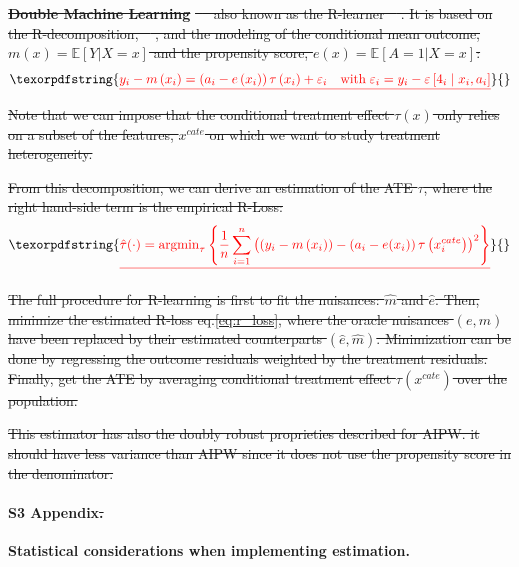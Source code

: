 \documentclass[10pt,letterpaper]{article}
\providecommand{\DIFdeltex}[1]{{\protect\color{red}\sout{#1}}}                      %
\providecommand{\DIFdelbegin}{} %
\providecommand{\DIFdelend}{} %
\providecommand{\DIFdel}[1]{\texorpdfstring{\DIFdeltex{#1}}{}} %
\newcommand{\DIFscaledelfig}{0.5}
\newlength{\DIFdelgraphicswidth} %
\newlength{\DIFdelgraphicsheight} %
\newcommand{\DIFdelincludegraphics}[2][]{%
\sbox{\DIFdelgraphicsbox}{\DIFOincludegraphics[#1]{#2}}%
\settoboxwidth{\DIFdelgraphicswidth}{\DIFdelgraphicsbox} %
\settoboxtotalheight{\DIFdelgraphicsheight}{\DIFdelgraphicsbox} %
\scalebox{\DIFscaledelfig}{%
\parbox[b]{\DIFdelgraphicswidth}{\usebox{\DIFdelgraphicsbox}\\[-\baselineskip] \rule{\DIFdelgraphicswidth}{0em}}\llap{\resizebox{\DIFdelgraphicswidth}{\DIFdelgraphicsheight}{%
\setlength{\unitlength}{\DIFdelgraphicswidth}%
\begin{picture}(1,1)%
\thicklines\linethickness{2pt} %
{\color[rgb]{1,0,0}\put(0,0){\framebox(1,1){}}}%
{\color[rgb]{1,0,0}\put(0,0){\line( 1,1){1}}}%
{\color[rgb]{1,0,0}\put(0,1){\line(1,-1){1}}}%
\end{picture}%
}\hspace*{3pt}}} %
} %
\DeclareRobustCommand{\DIFdelbegin}{\DIFOdelbegin \let\includegraphics\DIFdelincludegraphics} %
\DeclareRobustCommand{\DIFdelend}{\DIFOaddend \let\includegraphics\DIFOincludegraphics} %
\begin{document}
\textbf{\DIFdel{Double Machine Learning}} %
\DIFdel{\mbox{%
    \cite{chernozhukov2018double} }\hskip0pt%
  also known
  as the R-learner \mbox{%
    \cite{nie2021quasi}}\hskip0pt%
  . It is based on the R-decomposition,
  \mbox{%
    \cite{robinson1988root}}\hskip0pt%
  , and the modeling of the conditional mean outcome,
  $m(x)=\mathbb E[Y|X=x]$ and the propensity score, $e(x)=\mathbb E[A=1|X=x]$:
}\begin{displaymath}\DIFdel{\label{eq:r_decomposition}
  y_{i}-m\left(x_{i}\right)=\left(a_{i}-e\left(x_{i}\right)\right) \tau\left(x_{i}\right)+\varepsilon_{i} \quad \text{with} \; \varepsilon_{i}=y_{i}-\varepsilon\left[4_{i} \mid x_{i}, a_{i}\right]
  }\end{displaymath}%
\DIFdel{Note that we can impose that the conditional treatment effect $\tau(x)$ only
  relies on a subset of the features, $x^{cate}$ on which we want to study
  treatment heterogeneity.
}%

\DIFdel{From this decomposition, we can derive an estimation of the ATE $\tau$, where
  the right hand-side term is the empirical R-Loss:
}\begin{align*}\DIFdel{\label{eq:r_loss}
    \hat{\tau}(\cdot)=\operatorname{argmin}_{\tau}\left\{\frac{1}{n} \sum_{i=1}^{n}\left(\left(y_{i}-m\left(x_{i}\right)\right)-\left(a_{i}-e(x_{i})\right) \tau\left(x^{cate}_{i}\right)\right)^{2}\right\}
  }\end{align*}%

\DIFdel{The full procedure for R-learning is first to fit the nuisances: $\hat m$ and
  $\hat e$. Then, minimize the estimated R-loss eq.\ref{eq:r_loss}, where
  the oracle nuisances $(e, m)$ have been replaced by their estimated
  counterparts $(\hat e, \hat m)$. Minimization can be done by regressing
  the outcome residuals weighted by the treatment residuals. Finally, get
  the ATE by averaging conditional treatment effect $\tau(x^{cate})$ over
  the population.
}%

\DIFdel{This estimator has also the doubly robust proprieties described for AIPW. it
  should have less variance than AIPW since it does not use the propensity score
  in the denominator.
}%

\DIFdelend \paragraph*{S3 Appendix\DIFdelbegin \DIFdel{.}\DIFdelend }
\label{apd:statistical_considerations}
{\bf Statistical considerations when implementing
  estimation.}
\end{document}
